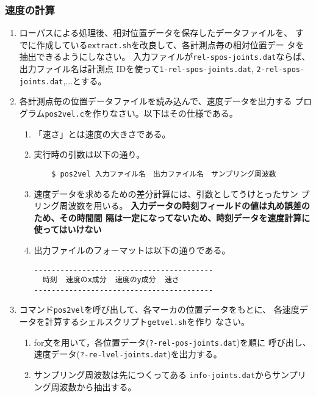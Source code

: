 \documentclass{jarticle}
\begin{document}
\subsubsection{速度の計算}
\begin{enumerate}
\item ローパスによる処理後、相対位置データを保存したデータファイルを、
すでに作成している\verb|extract.sh|を改良して、各計測点毎の相対位置デー
タを抽出できるようにしなさい。
入力ファイルが\verb|rel-spos-joints.dat|ならば、出力ファイル名は計測点
IDを使って\verb|1-rel-spos-joints.dat|, \verb|2-rel-spos-joints.dat|,...とする。
\item 各計測点毎の位置データファイルを読み込んで、速度データを出力する
プログラム\verb|pos2vel.c|を作りなさい。以下はその仕様である。
  \begin{enumerate}
  \item 「速さ」とは速度の大きさである。
  \item 実行時の引数は以下の通り。
\begin{verbatim}
    $ pos2vel 入力ファイル名　出力ファイル名　サンプリング周波数
\end{verbatim}
  \item 速度データを求めるための差分計算には、引数としてうけとったサン
    プリング周波数を用いる。
    \textbf{入力データの時刻フィールドの値は丸め誤差のため、その時間間
      隔は一定になってないため、時刻データを速度計算に使ってはいけない}
  \item 出力ファイルのフォーマットは以下の通りである。
\begin{verbatim}
-----------------------------------------
  時刻  速度のx成分  速度のy成分  速さ
-----------------------------------------
\end{verbatim}
  \end{enumerate}
\item コマンド\verb|pos2vel|を呼び出して、各マーカの位置データをもとに、
  各速度データを計算するシェルスクリプト\verb|getvel.sh|を作り
  なさい。
  \begin{enumerate}
  \item for文を用いて，各位置データ(\verb|?-rel-pos-joints.dat|)を順に
    呼び出し、速度データ(\verb|?-re-lvel-joints.dat|)を出力する。
  \item サンプリング周波数は先につくってある
    \verb|info-joints.dat|からサンプリング周波数から抽出する。
  \end{enumerate}
\end{enumerate}
\end{document}
